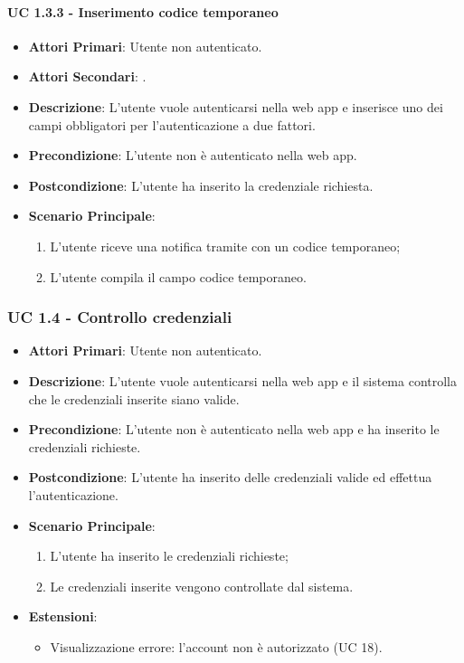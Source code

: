 			\paragraph{UC 1.3.3 - Inserimento codice temporaneo}
			\begin{itemize}
				\item \textbf{Attori Primari}: Utente non autenticato.
				\item \textbf{Attori Secondari}: .
				\item \textbf{Descrizione}: L'utente vuole autenticarsi nella web app e inserisce uno dei campi obbligatori per l'autenticazione a due fattori.
				\item \textbf{Precondizione}: L'utente non è autenticato nella web app.
				\item \textbf{Postcondizione}: L'utente ha inserito la credenziale richiesta.
				\item \textbf{Scenario Principale}:
				\begin{enumerate}
					\item L'utente riceve una notifica tramite  con un codice temporaneo;
					\item L'utente compila il campo codice temporaneo.
				\end{enumerate}	
			\end{itemize}

		\subsubsection{UC 1.4 - Controllo credenziali}
		\begin{itemize}
			\item \textbf{Attori Primari}: Utente non autenticato.
			\item \textbf{Descrizione}: L'utente vuole autenticarsi nella web app e il sistema controlla che le credenziali inserite siano valide.
			\item \textbf{Precondizione}: L'utente non è autenticato nella web app e ha inserito le credenziali richieste.
			\item \textbf{Postcondizione}: L'utente ha inserito delle credenziali valide ed effettua l'autenticazione.
			\item \textbf{Scenario Principale}:
			\begin{enumerate}
				\item L'utente ha inserito le credenziali richieste;
				\item Le credenziali inserite vengono controllate dal sistema.
			\end{enumerate}
			\item \textbf{Estensioni}:
			\begin{itemize}
				\item Visualizzazione errore: l'account non è autorizzato (UC 18).
			\end{itemize}	
		\end{itemize}

